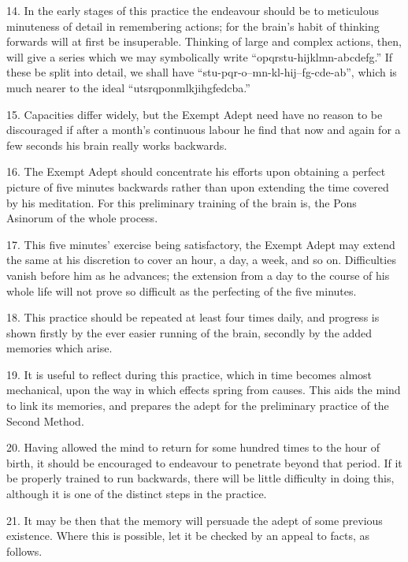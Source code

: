\begin{sloppypar}
14. In the early stages of this practice the endeavour should be to meticulous minuteness of detail in remembering actions; for the brain’s habit of thinking forwards will at first be insuperable. Thinking of large and complex actions, then, will give a series which we may symbolically write \mbox{\enquote{opqrstu-hijklmn-abcdefg.}} If these be split into detail, we shall have \mbox{\enquote{stu-pqr-o--mn-kl-hij--fg-cde-ab}}, which is much nearer to the ideal \mbox{\enquote{utsrqponmlkjihgfedcba.}}
\end{sloppypar}

15. Capacities differ widely, but the Exempt Adept need have no reason to be discouraged if after a month’s continuous labour he find that now and again for a few seconds his brain really works backwards.

16. The Exempt Adept should concentrate his efforts upon obtaining a perfect picture of five minutes backwards rather than upon extending the time covered by his meditation. For this preliminary training of the brain is, the Pons Asinorum of the whole process.

17. This five minutes' exercise being satisfactory, the Exempt Adept may extend the same at his discretion to cover an hour, a day, a week, and so on. Difficulties vanish before him as he advances; the extension from a day to the course of his whole life will not prove so difficult as the perfecting of the five minutes.

18. This practice should be repeated at least four times  daily, and progress is shown firstly by the ever easier running of the brain, secondly by the added memories which arise.

19. It is useful to reflect during this practice, which in time becomes almost mechanical, upon the way in which effects spring from causes. This aids the mind to link its memories, and prepares the adept for the preliminary practice of the Second Method.

20. Having allowed the mind to return for some hundred times to the hour of birth, it should be encouraged to endeavour to penetrate beyond that period. If it be properly trained to run backwards, there will be little difficulty in doing this, although it is one of the distinct steps in the practice.

21. It may be then that the memory will persuade the adept of some previous existence. Where this is possible, let it be checked by an appeal to facts, as follows.

